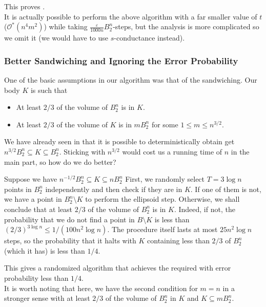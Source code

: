 This proves .\\
It is actually possible to perform the above algorithm with a far smaller value of $t$ ($\mathcal{O}^*(n^4m^2)$) while taking $\frac{\varepsilon}{1000n}B_2^n$-steps, but the analysis is more complicated so we omit it (we would have to use $s$-conductance instead). 

\subsubsection{Better Sandwiching and Ignoring the Error Probability}
\label{pro sandwiching}

One of the basic assumptions in our algorithm was that of the sandwiching. Our body $K$ is such that
\begin{itemize}
	\item At least $2/3$ of the volume of $B_2^n$ is in $K$.
	\item At least $2/3$ of the volume of $K$ is in $mB_2^n$ for some $1\leq m\leq n^{3/2}$.
\end{itemize}

We have already seen in  that it is possible to deterministically obtain get $n^{3/2}B_2^n\subseteq K\subseteq B_2^n$.
Sticking with $n^{3/2}$ would cost us a running time of $n$ in the main part, so how do we do better?

Suppose we have $n^{-1/2}B_2^n\subseteq K\subseteq nB_2^n$ First, we randomly select $T=3\log n$ points in $B_2^n$ independently and then check if they are in $K$. If one of them is not, we have a point in $B_2^n\setminus K$ to perform the ellipsoid step. Otherwise, we shall conclude that at least $2/3$ of the volume of $B_2^n$ is in $K$. Indeed, if not, the probability that we do not find a point in $B\setminus K$ is less than $(2/3)^{3\log n} \leq 1/(100n^2\log n)$. The procedure itself lasts at most $25n^2\log n$ steps, so the probability that it halts with $K$ containing less than $2/3$ of $B_2^n$ (which it has) is less than $1/4$.

This gives a randomized algorithm that achieves the required with error probability less than $1/4$.\\
It is worth noting that here, we have the second condition for $m=n$ in a stronger sense with at least $2/3$ of the volume of $B_2^n$ in $K$ and $K\subseteq m B_2^n$.\\


